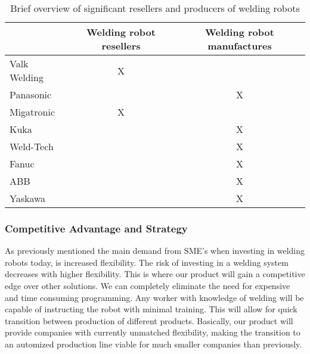 \begin{table}[h]
\centering
\begin{tabular}{|l|c|c|}
\hline
             & Welding robot resellers & Welding robot manufactures \\ 
\hline
Valk Welding & X                       &  \\ 
\hline
Panasonic    &                         & X \\ 
\hline
Migatronic   & X                       &  \\ 
\hline
Kuka         &                         & X \\ 
\hline
Weld-Tech    &                         & X \\ 
\hline                              
Fanuc        &                         & X \\ 
\hline                                 
ABB          &                         & X \\ 
\hline                                 
Yaskawa      &                         & X \\ 
\hline
\end{tabular} 
\caption{Brief overview of significant resellers and producers of welding robots}
\label{Tablecompetitors}
\end{table}

\subsubsection{Competitive Advantage and Strategy}
As previously mentioned the main demand from SME's when investing in welding robots today, is increased flexibility.
 The risk of investing in a welding system decreases with higher flexibility. This is where our product will gain a competitive edge over other solutions. We can completely eliminate the need for expensive and time consuming programming. Any worker with knowledge of welding will be capable of instructing the robot with minimal training. This will allow for quick transition between production of different products. Basically, our product will provide companies with currently unmatched flexibility, making the transition to an automized production line viable for much smaller companies than previously.
